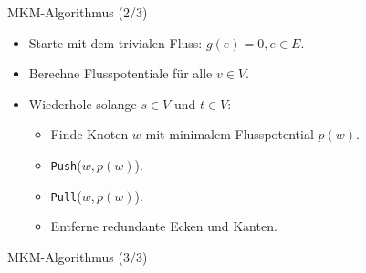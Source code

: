 \documentclass[aspectratio=169]{beamer}
\begin{document}
\begin{frame}{MKM-Algorithmus (2/3)}

  \begin{algorithmus*}[BlockMKM]
    \begin{itemize}
      \item Starte mit dem trivialen Fluss: $g(e) = 0 , e \in E$.
      \item Berechne Flusspotentiale für alle $v \in V$.
      \item Wiederhole solange $s \in V$ und $t \in V$:
      \begin{itemize}
        \item Finde Knoten $w$ mit minimalem Flusspotential $p(w)$.
        \item \texttt{Push}($w,p(w)$).
        \item \texttt{Pull}($w,p(w)$).
        \item Entferne redundante Ecken und Kanten.
      \end{itemize}
    \end{itemize}
  \end{algorithmus*}
  
\end{frame}

\begin{frame}{MKM-Algorithmus (3/3)}

  {\small
  \begin{algorithmus*}
    \begin{algorithm}[H]
      \begin{algorithmic}
          \EndProcedure
      \end{algorithmic}
    \end{algorithm}
  \end{algorithmus*}
  }

\end{frame}
\end{document}
